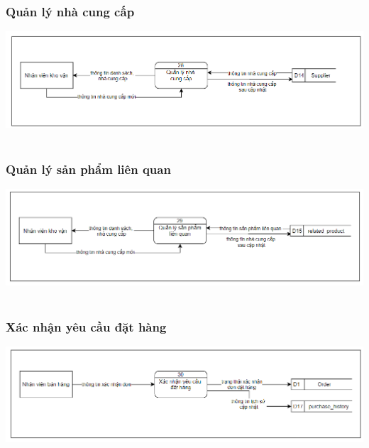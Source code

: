 \documentclass[12pt,a4paper,2sides]{report}
\begin{document}
\subsubsection{Quản lý nhà cung cấp}
    \includegraphics[width=1\linewidth]{lib/DFD/quanlynhacc.png}\\\vspace*{1cm} 
    \hspace{5cm}{Hình 23. Quản lý nhà cung cấp}\\
\subsubsection{Quản lý sản phẩm liên quan}
    \includegraphics[width=1\linewidth]{lib/DFD/quanlysplienquan.png}\\\vspace*{1cm} 
    \hspace{5cm}{Hình 24. Quản lý sản phẩm liên quan}\\
\subsubsection{Xác nhận yêu cầu đặt hàng}
    \includegraphics[width=1\linewidth]{lib/DFD/xacnhanyeucaudh.png}\\\vspace*{1cm} 
    \hspace{4cm}{Hình 25. Xác nhận yêu cầu đặt hàng}\\
\end{document}
